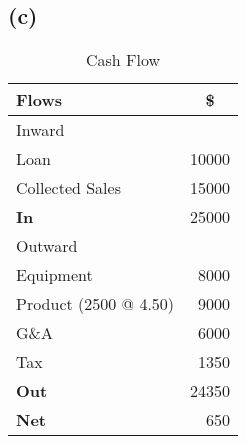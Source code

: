 \documentclass{article}
\newcommand{\ra}[1]{\renewcommand{\arraystretch}{#1}}
\begin{document}
	\subsection*{(c)}

	\begin{center}
	\begin{table*}[ht!]
	\centering
	\ra{1.3}
	\begin{tabular}{@{}lr@{}} \toprule
	Flows & \multicolumn{1}{c}{\$} \\
	\midrule
	Inward & \\ \cmidrule{1-1}
	Loan & 10000\\
	Collected Sales 	& 15000\\  \midrule
	\textbf{In} & 25000\\
	Outward & \\ \cmidrule{1-1}
	Equipment & 8000\\
	Product (2500 @ 4.50) & 9000\\
	G\&A & 6000\\ 
	Tax & 1350\\ \midrule
	\textbf{Out} & 24350\\ 
	\textbf{Net} & 650
	\end{tabular}
	\caption{Cash Flow}
	\end{table*}
	\end{center}
\end{document}
